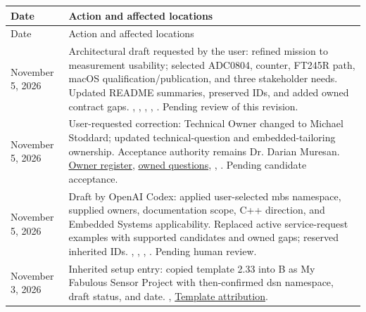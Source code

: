 \begin{tabularx}{\linewidth}{L{2.5cm}Y}
\caption{Project Document History\label{Table:DocumentHistory}}\\
\toprule
Date & Action and affected locations\\\midrule
\endfirsthead
\toprule
Date & Action and affected locations\\\midrule
\endhead
\bottomrule
\endlastfoot
November 5, 2026 & Architectural draft requested by the user: refined mission to measurement usability; selected ADC0804, counter, FT245R path, macOS qualification/publication, and three stakeholder needs. Updated README summaries, preserved IDs, and added owned contract gaps. , , , , . Pending review of this revision.\\
November 5, 2026 & User-requested correction: Technical Owner changed to Michael Stoddard; updated technical-question and embedded-tailoring ownership. Acceptance authority remains Dr. Darian Muresan. \hyperref[Table:ProjectOwners]{Owner register}, \hyperref[Table:OwnedQuestions]{owned questions}, , . Pending candidate acceptance.\\
November 5, 2026 & Draft by OpenAI Codex: applied user-selected mbs namespace, supplied owners, documentation scope, C++ direction, and Embedded Systems applicability. Replaced active service-request examples with supported candidates and owned gaps; reserved inherited IDs. , , , . Pending human review.\\
November 3, 2026 & Inherited setup entry: copied template 2.33 into B as My Fabulous Sensor Project with then-confirmed dsn namespace, draft status, and date. , \hyperref[Chapter:TemplateAttribution]{Template attribution}.\\
\end{tabularx}
\normalsize
